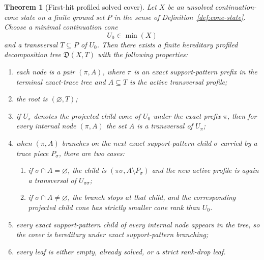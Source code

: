 \documentclass[11pt]{article}
\newtheorem{theorem}{Theorem}[section]
\theoremstyle{definition}
\newcommand{\1}{\mathbf{1}}
\begin{document}
\begin{theorem}[First-hit profiled solved cover]\label{thm:first-hit-profiled-cover}
Let $X$ be an unsolved continuation-cone state on a finite ground set $P$ in the sense of Definition~\ref{def:cone-state}.
Choose a minimal continuation cone
\[
U_0\in \min(X)
\]
and a transversal $T\subseteq P$ of $U_0$.
Then there exists a finite hereditary profiled decomposition tree $\mathfrak D(X,T)$ with the following properties:
\begin{enumerate}[label=(\roman*),leftmargin=2.2em]
\item each node is a pair $(\pi,A)$, where $\pi$ is an exact support-pattern prefix in the terminal exact-trace tree and $A\subseteq T$ is the active transversal profile;
\item the root is $(\varnothing,T)$;
\item if $U_\pi$ denotes the projected child cone of $U_0$ under the exact prefix $\pi$, then for every internal node $(\pi,A)$ the set $A$ is a transversal of $U_\pi$;
\item when $(\pi,A)$ branches on the next exact support-pattern child $\sigma$ carried by a trace piece $P_\sigma$, there are two cases:
\begin{enumerate}[label=(\alph*),leftmargin=2.2em]
\item if $\sigma\cap A=\varnothing$, the child is $(\pi\sigma,A\setminus P_\sigma)$ and the new active profile is again a transversal of $U_{\pi\sigma}$;
\item if $\sigma\cap A\neq \varnothing$, the branch stops at that child, and the corresponding projected child cone has strictly smaller cone rank than $U_0$.
\end{enumerate}
\item every exact support-pattern child of every internal node appears in the tree, so the cover is hereditary under exact support-pattern branching;
\item every leaf is either empty, already solved, or a strict rank-drop leaf.
\end{enumerate}
\end{theorem}
\end{document}
